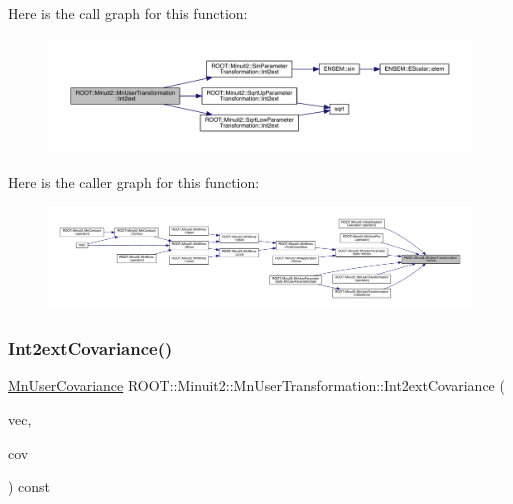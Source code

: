 Here is the call graph for this function\+:\nopagebreak
\begin{figure}[H]
\begin{center}
\leavevmode
\includegraphics[width=350pt]{d9/d98/classROOT_1_1Minuit2_1_1MnUserTransformation_aa05e327d2e4376c0e1db865ba92becdd_cgraph}
\end{center}
\end{figure}
Here is the caller graph for this function\+:\nopagebreak
\begin{figure}[H]
\begin{center}
\leavevmode
\includegraphics[width=350pt]{d9/d98/classROOT_1_1Minuit2_1_1MnUserTransformation_aa05e327d2e4376c0e1db865ba92becdd_icgraph}
\end{center}
\end{figure}
\mbox{\label{classROOT_1_1Minuit2_1_1MnUserTransformation_a10f2146be0a2c991243dd2f70a943a15}} 
\subsubsection{\texorpdfstring{Int2extCovariance()}{Int2extCovariance()}\hspace{0.1cm}{\footnotesize\ttfamily [1/2]}}
{\footnotesize\ttfamily \mbox{\hyperlink{classROOT_1_1Minuit2_1_1MnUserCovariance}{Mn\+User\+Covariance}} R\+O\+O\+T\+::\+Minuit2\+::\+Mn\+User\+Transformation\+::\+Int2ext\+Covariance (\begin{DoxyParamCaption}\item[{const \mbox{\hyperlink{namespaceROOT_1_1Minuit2_a62ed97730a1ca8d3fbaec64a19aa11c9}{Mn\+Algebraic\+Vector}} \&}]{vec,  }\item[{const \mbox{\hyperlink{namespaceROOT_1_1Minuit2_a9e74ad97f5537a2e80e52b04d98ecc6e}{Mn\+Algebraic\+Sym\+Matrix}} \&}]{cov }\end{DoxyParamCaption}) const}

